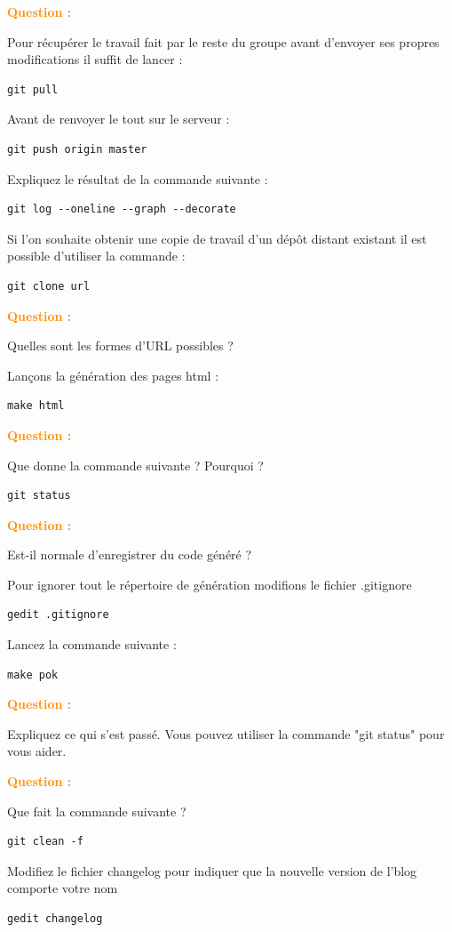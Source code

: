 \documentclass[a4paper]{article}
\newcounter{question}
\newcommand{\q}{
  \textcolor{DarkOrange}{\textbf{Question \thequestion : }}
  \addtocounter{question}{1}
  \newline
}
\begin{document}
\q Pour récupérer le travail fait par le reste du groupe avant d'envoyer ses propres modifications il suffit de lancer : 

\begin{verbatim}
git pull 
\end{verbatim}

Avant de renvoyer le tout sur le serveur :
\begin{verbatim}
git push origin master
\end{verbatim}

Expliquez le résultat de la commande suivante : 
\begin{verbatim}
git log --oneline --graph --decorate
\end{verbatim}

Si l'on souhaite obtenir une copie de travail d'un dépôt distant existant il est possible d'utiliser la commande :
\begin{verbatim}
git clone url
\end{verbatim}

\q Quelles sont les formes d'URL possibles ?

Lançons la génération des pages html : 
\begin{verbatim}
make html
\end{verbatim}

\q Que donne la commande suivante ? Pourquoi ? 
\begin{verbatim}
git status
\end{verbatim}

\q Est-il normale d'enregistrer du code généré ? 

Pour ignorer tout le répertoire de génération modifions le fichier .gitignore
\begin{verbatim}
gedit .gitignore
\end{verbatim}

Lancez la commande suivante :
\begin{verbatim}
make pok
\end{verbatim}
\q Expliquez ce qui s'est passé. Vous pouvez utiliser la commande "git status" pour vous aider.

\q Que fait la commande suivante ?
\begin{verbatim}
git clean -f
\end{verbatim}

Modifiez le fichier changelog pour indiquer que la nouvelle version de l'blog comporte votre nom
\begin{verbatim}
gedit changelog
\end{verbatim}
\end{document}
